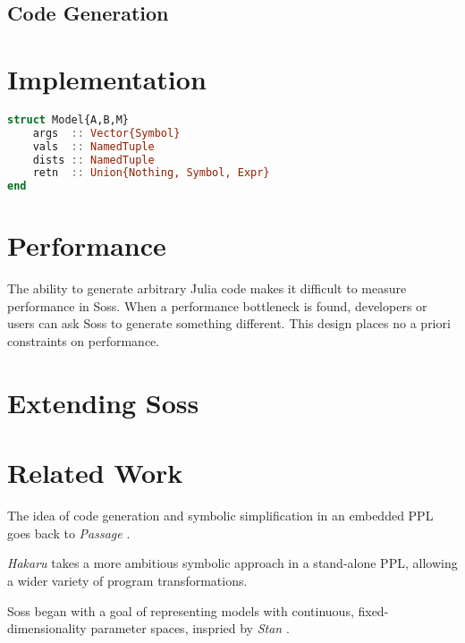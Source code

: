 \documentclass[anonymous=false, %
               format=acmsmall, %
               review=true, %
               screen=true, %
               nonacm=true]{acmart}
\begin{document}
\subsection{Code Generation}

\section{Implementation}

\begin{lstlisting}[language=julia]
struct Model{A,B,M} 
    args  :: Vector{Symbol}
    vals  :: NamedTuple
    dists :: NamedTuple
    retn  :: Union{Nothing, Symbol, Expr}
end
\end{lstlisting}


\section{Performance}



The ability to generate arbitrary  Julia code makes it difficult to measure performance in Soss. When a performance bottleneck is found, developers or users can ask Soss to generate something different. This design places no a priori constraints on performance.


\section{Extending Soss}

\section{Related Work}

The idea of code generation and symbolic simplification in an embedded PPL goes back to \emph{Passage} \cite{Scherrer2012}. 

\emph{Hakaru} \cite{narayanan2016probabilistic} takes a more ambitious symbolic approach in a stand-alone PPL, allowing a wider variety of program transformations. 

Soss began with a goal of representing models with continuous, fixed-dimensionality parameter spaces, inspried by \emph{Stan} \cite{stan:2017}.
\end{document}
